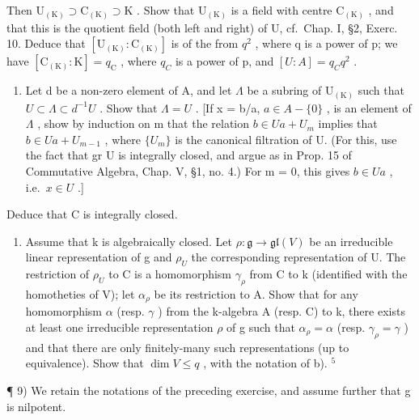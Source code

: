 Then \(\mathrm{U}_{(\mathrm{K})}\supset\mathrm{C}_{(\mathrm{K})}\supset\mathrm{K}\) . Show that \(\mathrm{U}_{(\mathrm{K})}\) is a field with centre \(\mathrm{C}_{(\mathrm{K})}\) , and that this is the quotient field (both left and right) of U, cf.~Chap. I, §2, Exerc. 10. Deduce that \([\mathrm{U}_{(\mathrm{K})}:\mathrm{C}_{(\mathrm{K})}]\) is of the from \(q^{2}\) , where q is a power of p; we have \([\mathrm{C}_{(\mathrm{K})}:\mathrm{K}]=q_{\mathrm{C}}\) , where \(q_{C}\) is a power of p, and \([U:A]=q_{C}q^{2}\) .

\begin{enumerate}
\def\labelenumi{\alph{enumi})}
\setcounter{enumi}{2}
\tightlist
\item
  Let d be a non-zero element of A, and let \(\Lambda\) be a subring of \(\mathrm{U}_{(\mathrm{K})}\) such that \(U \subset \Lambda \subset d^{-1}U\) . Show that \(\Lambda = U\) . {[}If x = b/a, \(a \in A - \{0\}\) , is an element of \(\Lambda\) , show by induction on m that the relation \(b \in Ua + U_m\) implies that \(b \in Ua + U_{m-1}\) , where \(\{U_m\}\) is the canonical filtration of U. (For this, use the fact that gr U is integrally closed, and argue as in Prop. 15 of Commutative Algebra, Chap. V, §1, no. 4.) For m = 0, this gives \(b \in Ua\) , i.e.~\(x \in U\) .{]}
\end{enumerate}

Deduce that C is integrally closed.

\begin{enumerate}
\def\labelenumi{\alph{enumi})}
\setcounter{enumi}{3}
\tightlist
\item
  Assume that k is algebraically closed. Let \(\rho: \mathfrak{g} \to \mathfrak{gl}(V)\) be an irreducible linear representation of g and \(\rho_{U}\) the corresponding representation of U. The restriction of \(\rho_{U}\) to C is a homomorphism \(\gamma_{\rho}\) from C to k (identified with the homotheties of V); let \(\alpha_{\rho}\) be its restriction to A. Show that for any homomorphism \(\alpha\) (resp. \(\gamma\) ) from the k-algebra A (resp. C) to k, there exists at least one irreducible representation \(\rho\) of g such that \(\alpha_{\rho} = \alpha\) (resp. \(\gamma_{\rho} = \gamma\) ) and that there are only finitely-many such representations (up to equivalence). Show that \(\dim V \leq q\) , with the notation of b). \(^{5}\)
\end{enumerate}

¶ 9) We retain the notations of the preceding exercise, and assume further that g is nilpotent.


